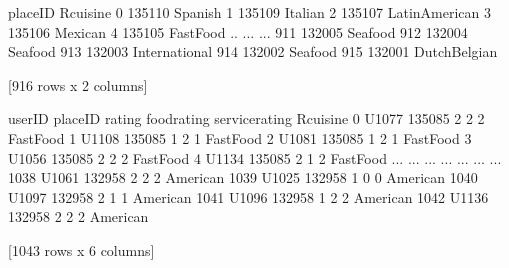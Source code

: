 \documentclass[letterpaper,10pt,english]{jupyterBook}
\begin{document}
\begin{sphinxVerbatim}[commandchars=\\\{\}]
  
\end{sphinxVerbatim}

\begin{sphinxVerbatim}[commandchars=\\\{\}]
     placeID        Rcuisine
0     135110         Spanish
1     135109         Italian
2     135107  Latin\PYGZus{}American
3     135106         Mexican
4     135105       Fast\PYGZus{}Food
..       ...             ...
911   132005         Seafood
912   132004         Seafood
913   132003   International
914   132002         Seafood
915   132001   Dutch\PYGZhy{}Belgian

[916 rows x 2 columns]
\end{sphinxVerbatim}

\begin{sphinxVerbatim}[commandchars=\\\{\}]
     
\end{sphinxVerbatim}

\begin{sphinxVerbatim}[commandchars=\\\{\}]
     userID  placeID  rating  food\PYGZus{}rating  service\PYGZus{}rating   Rcuisine
0     U1077   135085       2            2               2  Fast\PYGZus{}Food
1     U1108   135085       1            2               1  Fast\PYGZus{}Food
2     U1081   135085       1            2               1  Fast\PYGZus{}Food
3     U1056   135085       2            2               2  Fast\PYGZus{}Food
4     U1134   135085       2            1               2  Fast\PYGZus{}Food
...     ...      ...     ...          ...             ...        ...
1038  U1061   132958       2            2               2   American
1039  U1025   132958       1            0               0   American
1040  U1097   132958       2            1               1   American
1041  U1096   132958       1            2               2   American
1042  U1136   132958       2            2               2   American

[1043 rows x 6 columns]
\end{sphinxVerbatim}
\end{document}
